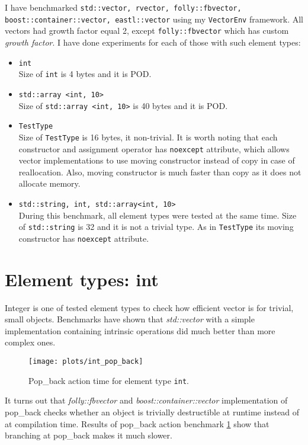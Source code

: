 \documentclass[inz, english, shortabstract]{iithesis}
\begin{document}
I have benchmarked {\tt std::vector, rvector, folly::fbvector, boost::container::vector, eastl::vector} using my {\tt VectorEnv} framework. All vectors had growth factor equal 2, except {\tt folly::fbvector} which has custom \emph{growth factor}. I have done experiments for each of those with such element types:
\begin{itemize}
\item \lstinline{int}
\\
Size of \lstinline{int} is 4 bytes and it is POD.
\item \lstinline{std::array <int, 10>}
\\
Size of \lstinline{std::array <int, 10>} is 40 bytes and it is POD.
\item \lstinline{TestType}
\\
Size of \lstinline{TestType} is 16 bytes, it non-trivial. It is worth noting that each constructor and assignment operator has {\tt noexcept} attribute, which allows vector implementations to use moving constructor instead of copy in case of reallocation. Also, moving constructor is much faster than copy as it does not allocate memory.
\item \lstinline{std::string, int, std::array<int, 10>}
\\
During this benchmark, all element types were tested at the same time. Size of \lstinline{std::string} is 32 and it is not a trivial type. As in \lstinline{TestType} its moving constructor has {\tt noexcept} attribute.
\end{itemize}

\section{Element types: int}
Integer is one of tested element types to check how efficient vector is for trivial, small objects. Benchmarks have shown that {\it std::vector} with a simple implementation containing intrinsic operations did much better than more complex ones. 

\begin{figure}[h!]
\texttt{[image: plots/int\_pop\_back]}
\caption{Pop\_back action time for element type \lstinline{int}.}
\label{int_pop_back}
\end{figure}

It turns out that {\it folly::fbvector} and {\it boost::container::vector} implementation of pop\_back checks whether an object is trivially destructible at runtime instead of at compilation time. Results of pop\_back action benchmark \ref{int_pop_back} show that branching at pop\_back makes it much slower.
\end{document}
